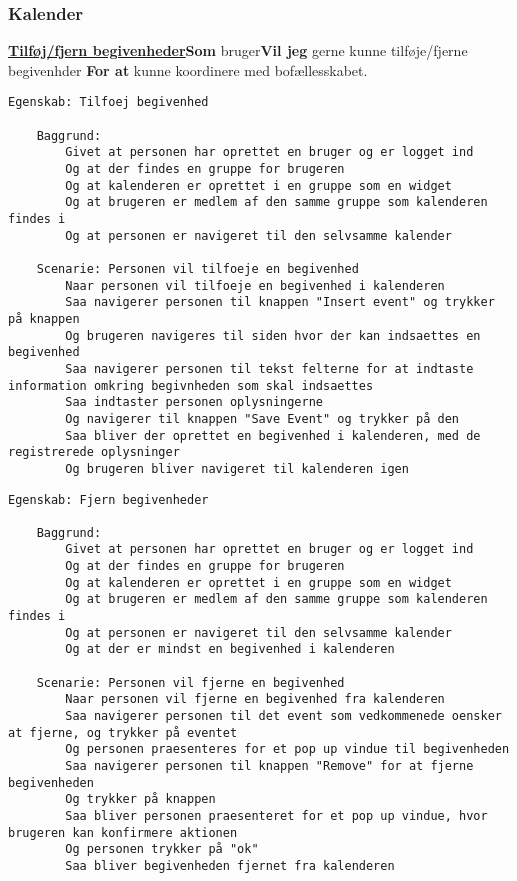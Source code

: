 \subsubsection{Kalender}

\noindent \textbf{\underline{Tilføj/fjern begivenheder}}\newline \textbf{Som} bruger\newline \textbf{Vil jeg} gerne kunne tilføje/fjerne begivenhder
\newline \textbf{For at} kunne koordinere med bofællesskabet. 

\begin{lstlisting}[language=Gherkin]
Egenskab: Tilfoej begivenhed

    Baggrund:
        Givet at personen har oprettet en bruger og er logget ind
        Og at der findes en gruppe for brugeren
        Og at kalenderen er oprettet i en gruppe som en widget
        Og at brugeren er medlem af den samme gruppe som kalenderen findes i
        Og at personen er navigeret til den selvsamme kalender
        
    Scenarie: Personen vil tilfoeje en begivenhed
        Naar personen vil tilfoeje en begivenhed i kalenderen
        Saa navigerer personen til knappen "Insert event" og trykker på knappen
        Og brugeren navigeres til siden hvor der kan indsaettes en begivenhed
        Saa navigerer personen til tekst felterne for at indtaste information omkring begivnheden som skal indsaettes
        Saa indtaster personen oplysningerne
        Og navigerer til knappen "Save Event" og trykker på den
        Saa bliver der oprettet en begivenhed i kalenderen, med de registrerede oplysninger
        Og brugeren bliver navigeret til kalenderen igen

\end{lstlisting}

\begin{lstlisting}[language=Gherkin]
Egenskab: Fjern begivenheder

    Baggrund:
        Givet at personen har oprettet en bruger og er logget ind
        Og at der findes en gruppe for brugeren
        Og at kalenderen er oprettet i en gruppe som en widget
        Og at brugeren er medlem af den samme gruppe som kalenderen findes i
        Og at personen er navigeret til den selvsamme kalender
        Og at der er mindst en begivenhed i kalenderen
        
    Scenarie: Personen vil fjerne en begivenhed
        Naar personen vil fjerne en begivenhed fra kalenderen
        Saa navigerer personen til det event som vedkommenede oensker at fjerne, og trykker på eventet
        Og personen praesenteres for et pop up vindue til begivenheden
        Saa navigerer personen til knappen "Remove" for at fjerne begivenheden
        Og trykker på knappen
        Saa bliver personen praesenteret for et pop up vindue, hvor brugeren kan konfirmere aktionen
        Og personen trykker på "ok"
        Saa bliver begivenheden fjernet fra kalenderen

\end{lstlisting}

